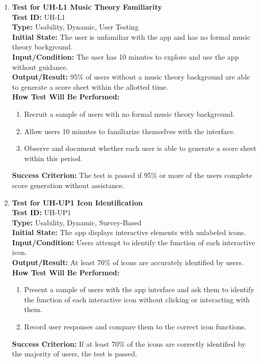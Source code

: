 \documentclass[12pt, titlepage]{article}
\begin{document}
\begin{enumerate}
    \item \textbf{Test for UH-L1 Music Theory Familiarity} \\
      \newline
      \textbf{Test ID:} UH-L1 \\
      \textbf{Type:} Usability, Dynamic, User Testing \\
      \textbf{Initial State:} The user is unfamiliar with the app and has no formal music theory background. \\
      \textbf{Input/Condition:} The user has 10 minutes to explore and use the app without guidance. \\
      \textbf{Output/Result:} 95\% of users without a music theory background are able to generate a score sheet within the allotted time. \\
      \textbf{How Test Will Be Performed:}
      \begin{enumerate}
          \item Recruit a sample of users with no formal music theory background.
          \item Allow users 10 minutes to familiarize themselves with the interface.
          \item Observe and document whether each user is able to generate a score sheet within this period.
      \end{enumerate}
      \textbf{Success Criterion:} The test is passed if 95\% or more of the users complete score generation without assistance.

    \item \textbf{Test for UH-UP1 Icon Identification} \\
      \newline
      \textbf{Test ID:} UH-UP1 \\
      \textbf{Type:} Usability, Dynamic, Survey-Based \\
      \textbf{Initial State:} The app displays interactive elements with unlabeled icons. \\
      \textbf{Input/Condition:} Users attempt to identify the function of each interactive icon. \\
      \textbf{Output/Result:} At least 70\% of icons are accurately identified by users. \\
      \textbf{How Test Will Be Performed:}
      \begin{enumerate}
          \item Present a sample of users with the app interface and ask them to identify the function of each interactive icon without clicking or interacting with them.
          \item Record user responses and compare them to the correct icon functions.
      \end{enumerate}
      \textbf{Success Criterion:} If at least 70\% of the icons are correctly identified by the majority of users, the test is passed.


\end{enumerate}
\end{document}

